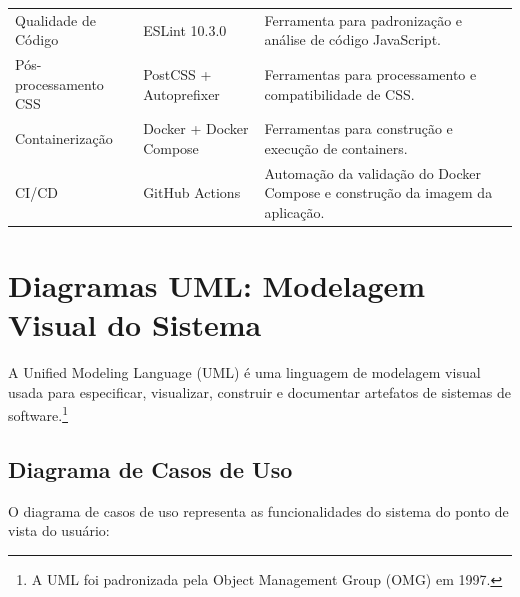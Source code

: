\documentclass[11pt,a4paper]{article}
\begin{document}
\begin{table}[H]
\begin{tabular}{|l|l|p{6cm}|}
Qualidade de Código & ESLint 10.3.0 & Ferramenta para padronização e análise de código JavaScript. \\

Pós-processamento CSS & PostCSS + Autoprefixer & Ferramentas para processamento e compatibilidade de CSS. \\

Containerização & Docker + Docker Compose & Ferramentas para construção e execução de containers. \\

CI/CD & GitHub Actions & Automação da validação do Docker Compose e construção da imagem da aplicação. \\

\hline
\end{tabular}

\end{table}

\section{Diagramas UML: Modelagem Visual do Sistema}

A Unified Modeling Language (UML) \cite{kumar2024} é uma linguagem de modelagem visual usada para especificar, visualizar, construir e documentar artefatos de sistemas de software.\footnote{A UML foi padronizada pela Object Management Group (OMG) em 1997.}

\subsection{Diagrama de Casos de Uso}

O diagrama de casos de uso representa as funcionalidades do sistema do ponto de vista do usuário:
\end{document}
